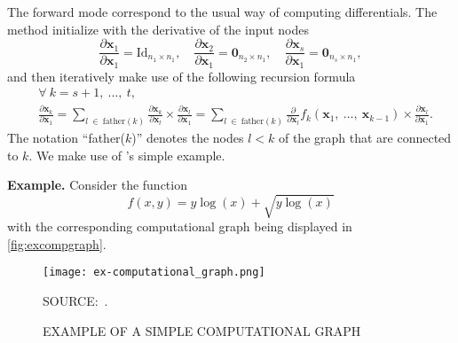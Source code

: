 The forward mode correspond to the usual way of computing differentials.
The method initialize with the derivative of the input nodes
\[
  \frac{\partial\mathbf{x}_{1}}{\partial\mathbf{x}_{1}} =
  \text{Id}_{n_{1} \times n_{1}},\quad
  \frac{\partial\mathbf{x}_{2}}{\partial\mathbf{x}_{1}} =
  \mathbf{0}_{n_{2} \times n_{1}},\quad
  \frac{\partial\mathbf{x}_{s}}{\partial\mathbf{x}_{1}} =
  \mathbf{0}_{n_{s} \times n_{1}},
\]
and then iteratively make use of the following recursion formula
\begin{align*}
  &\forall~k = s + 1,~\dots,~t,\\
  &\frac{\partial\mathbf{x}_{k}}{\partial\mathbf{x}_{1}} =
    \sum_{l~\in~\text{father}(k)}
    \frac{\partial\mathbf{x}_{k}}{\partial\mathbf{x}_{l}}\times
    \frac{\partial\mathbf{x}_{l}}{\partial\mathbf{x}_{1}} =
    \sum_{l~\in~\text{father}(k)}
    \frac{\partial}{\partial\mathbf{x}_{l}}
    f_{k}(\mathbf{x}_{1},~\dots,~\mathbf{x}_{k-1})\times
    \frac{\partial\mathbf{x}_{l}}{\partial\mathbf{x}_{1}}.
\end{align*}
The notation ``father(\(k\))'' denotes the nodes \(l < k\) of the graph
that are connected to \(k\). We make use of 's
simple example.

\noindent\textbf{Example.}\hspace{.5cm}
Consider the function
\[
  f(x, y) = y\log(x) + \sqrt{y\log(x)}
\]
with the corresponding computational graph being displayed in
\autoref{fig:excompgraph}.

\begin{figure}[H]
  \setlength{\abovecaptionskip}{.0001pt}
  \caption{EXAMPLE OF A SIMPLE COMPUTATIONAL GRAPH}
  \vspace{0.3cm} \centering
  \texttt{[image: ex-computational\_graph.png]}
  \\
  \vspace{0.3cm}
  \begin{footnotesize}
    SOURCE:~.
  \end{footnotesize}
  \label{fig:excompgraph}
\end{figure}

